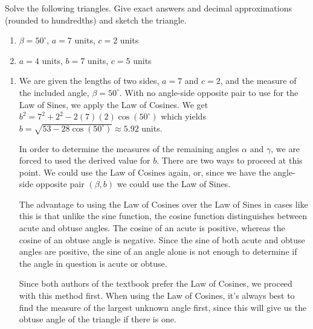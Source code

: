 \documentclass{ximera}
\begin{document}
\begin{example}  \label{locex}  Solve the following triangles.  Give exact answers and decimal approximations (rounded to hundredths) and sketch the triangle.

\begin{enumerate}

\item  \label{locsas} $\beta = 50^{\circ}$, $a = 7$ units, $c=2$ units

\item  \label{locsss} $a=4$ units, $b=7$ units, $c = 5$ units

\end{enumerate}

\begin{explanation}

\begin{enumerate}

\item  We are given the lengths of two sides, $a=7$ and $c = 2$, and the measure of the included angle, $\beta = 50^{\circ}$.  With no angle-side opposite pair to use for the Law of Sines, we apply  the Law of Cosines.  We get  $b^2 = 7^2 + 2^2 - 2(7)(2)\cos\left(50^{\circ}\right)$ which yields $b = \sqrt{53-28\cos\left(50^{\circ}\right)} \approx 5.92$ units.  
 

In order to determine the measures of the remaining angles $\alpha$ and $\gamma$, we are forced to used the derived value for $b$.  There are two ways to proceed at this point.  We could use the Law of Cosines again, or, since  we have the angle-side opposite pair $(\beta, b)$ we could use the Law of Sines. 

 

The advantage to using the Law of Cosines over the Law of Sines in cases like this is that unlike the sine function, the cosine function distinguishes between acute and obtuse angles.  The cosine of an acute is positive, whereas the cosine of an obtuse angle is negative.  Since the sine of both acute and obtuse angles are positive, the sine of an angle alone is not enough to determine if the angle in question is acute or obtuse.  

 

Since both authors of the textbook prefer the Law of Cosines, we proceed with this method first.  When using the Law of Cosines, it's always best to find the measure of the largest unknown angle first, since this will give us the obtuse angle of the triangle if there is one.  


\end{enumerate}
\end{explanation}
\end{example}
\end{document}
